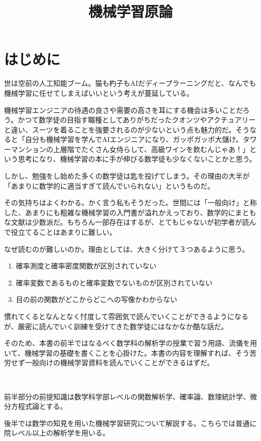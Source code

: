 \documentclass[dvipdfmx, a4paper]{jsarticle}
\title{機械学習原論}
\author{}
\begin{document}
\maketitle

\section{はじめに}
世は空前の人工知能ブーム。猫も杓子もAIだディープラーニングだと、なんでも機械学習に任せてしまえばいいという考えが蔓延している。

機械学習エンジニアの待遇の良さや需要の高さを耳にする機会は多いことだろう。かつて数学徒の目指す職種としてありがちだったクオンツやアクチュアリーと違い、スーツを着ることを強要されるのが少ないという点も魅力的だ。そうなると「自分も機械学習を学んでAIエンジニアになり、ガッポガッポ大儲け。タワーマンションの上層階でたくさん女侍らして、高級ワインを飲むんじゃあ！」という思考になり、機械学習の本に手が伸びる数学徒も少なくないことかと思う。

しかし、勉強をし始めた多くの数学徒は匙を投げてしまう。その理由の大半が「あまりに数学的に適当すぎて読んでいられない」というものだ。

その気持ちはよくわかる。かく言う私もそうだった。世間には「一般向け」と称した、あまりにも粗雑な機械学習の入門書が溢れかえっており、数学的にまともな文献は少数派だ。もちろん一部存在はするが、とてもじゃないが初学者が読んで役立てることはあまりに難しい。

なぜ読むのが難しいのか。理由としては、大きく分けて３つあるように思う。
\begin{enumerate}
\item 確率測度と確率密度関数が区別されていない
\item 確率変数であるものと確率変数でないものが区別されていない
\item 目の前の関数がどこからどこへの写像かわからない
\end{enumerate}
慣れてくるとなんとなく忖度して雰囲気で読んでいくことができるようになるが、厳密に読んでいく訓練を受けてきた数学徒にはなかなか酷な話だ。

そのため、本書の前半ではなるべく数学科の解析学の授業で習う用語、流儀を用いて、機械学習の基礎を書くことを心掛けた。本書の内容を理解すれば、そう苦労せず一般向けの機械学習資料を読んでいくことができるはずだ。

　

前半部分の前提知識は数学科学部レベルの関数解析学、確率論、数理統計学、微分方程式論とする。

後半では数学の知見を用いた機械学習研究について解説する。こちらでは普通に院レベル以上の解析学を用いる。
\end{document}
